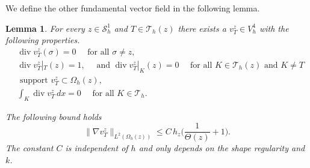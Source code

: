 \documentclass[11pt]{amsart}
\numberwithin{equation}{section}
\newcommand{\Sh}{\mathcal{S}_h}
\newcommand{\dive}{\operatorname{div}}
\newcommand{\Th}{\mathcal{T}_h}
\newtheorem{lemma}{Lemma}
\theoremstyle{definition}
\begin{document}
We define the other fundamental vector field in the following lemma.
\begin{lemma}\label{lemmavz}
For every $z \in \Sh^1$ and $T \in \Th(z)$ there exists a $v_T^z \in V_h^4$ with the following properties. 
\begin{subequations}\label{lemma1vertex}
\begin{alignat}{1}
&\dive v_T^z (\sigma)= 0 \quad \text{ for all } \sigma \neq z,  \label{lemma1vertex1} \\
& \dive v_T^z|_T(z)=1, \quad \text{ and }  \dive v_T^z|_K (z)=0  \quad \text{ for all } K \in \Th(z) \text{ and } K \neq T \label{lemma1vertex2} \\
& \text{ support } v_T^z \subset  \Omega_h(z),  \label{lemma1vertex3} \\
& \int_K \dive v_T^z \, dx=0 \quad \text{ for all } K \in \Th. \label{lemma1vertex4}
\end{alignat}
\end{subequations}

The following bound holds
\begin{equation}\label{lemma1vertex5}
 \|\nabla v_T^z \|_{L^2(\Omega_h(z))} \le C \, h_z\Big(\frac{1}{\Theta(z)}+1\Big).
\end{equation}
The constant $C$ is independent of  $h$ and only depends on the shape regularity and $k$.
 
\end{lemma} 
\end{document}
